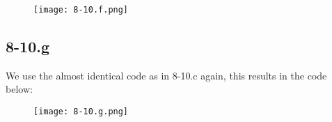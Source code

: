 \documentclass{article}
\begin{document}
\begin{figure}[!hbt]
    \centering
    \texttt{[image: 8-10.f.png]}
\end{figure}
\subsection*{8-10.g}
We use the almost identical code as in 8-10.c again, this results in the code below:

\begin{figure}[!hbt]
    \centering
    \texttt{[image: 8-10.g.png]}
\end{figure}
\end{document}
